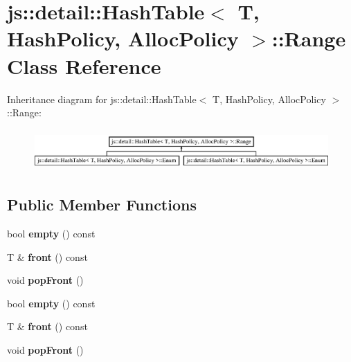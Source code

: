 \hypertarget{classjs_1_1detail_1_1_hash_table_1_1_range}{\section{js\-:\-:detail\-:\-:Hash\-Table$<$ T, Hash\-Policy, Alloc\-Policy $>$\-:\-:Range Class Reference}
\label{classjs_1_1detail_1_1_hash_table_1_1_range}
}
Inheritance diagram for js\-:\-:detail\-:\-:Hash\-Table$<$ T, Hash\-Policy, Alloc\-Policy $>$\-:\-:Range\-:\begin{figure}[H]
\begin{center}
\leavevmode
\includegraphics[height=1.600000cm]{classjs_1_1detail_1_1_hash_table_1_1_range}
\end{center}
\end{figure}
\subsection*{Public Member Functions}
\begin{DoxyCompactItemize}
\item 
\hypertarget{classjs_1_1detail_1_1_hash_table_1_1_range_a0bb77001e6cfc50f1c334f86540b050c}{bool {\bfseries empty} () const }\label{classjs_1_1detail_1_1_hash_table_1_1_range_a0bb77001e6cfc50f1c334f86540b050c}

\item 
\hypertarget{classjs_1_1detail_1_1_hash_table_1_1_range_a983fb492b2f93704d9880959f4e2b5e1}{T \& {\bfseries front} () const }\label{classjs_1_1detail_1_1_hash_table_1_1_range_a983fb492b2f93704d9880959f4e2b5e1}

\item 
\hypertarget{classjs_1_1detail_1_1_hash_table_1_1_range_a735a674cde42778b0a4062a78d2f7531}{void {\bfseries pop\-Front} ()}\label{classjs_1_1detail_1_1_hash_table_1_1_range_a735a674cde42778b0a4062a78d2f7531}

\item 
\hypertarget{classjs_1_1detail_1_1_hash_table_1_1_range_a0bb77001e6cfc50f1c334f86540b050c}{bool {\bfseries empty} () const }\label{classjs_1_1detail_1_1_hash_table_1_1_range_a0bb77001e6cfc50f1c334f86540b050c}

\item 
\hypertarget{classjs_1_1detail_1_1_hash_table_1_1_range_a983fb492b2f93704d9880959f4e2b5e1}{T \& {\bfseries front} () const }\label{classjs_1_1detail_1_1_hash_table_1_1_range_a983fb492b2f93704d9880959f4e2b5e1}

\item 
\hypertarget{classjs_1_1detail_1_1_hash_table_1_1_range_a735a674cde42778b0a4062a78d2f7531}{void {\bfseries pop\-Front} ()}\label{classjs_1_1detail_1_1_hash_table_1_1_range_a735a674cde42778b0a4062a78d2f7531}

\end{DoxyCompactItemize}

